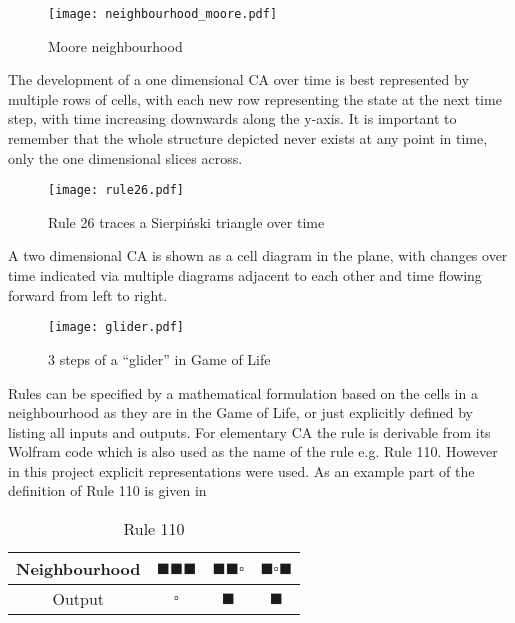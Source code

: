 \begin{figure}[h]
    \centering
    \texttt{[image: neighbourhood\_moore.pdf]}
    \caption{Moore neighbourhood}
    \label{fig:moore}
\end{figure}

The development of a one dimensional CA over time is best represented by multiple rows of cells,
with each new row representing the state at the next time step,
with time increasing downwards along the y-axis.
It is important to remember that the whole structure depicted never exists at any point in time,
only the one dimensional slices across.

\begin{figure}[h]
    \centering
    \texttt{[image: rule26.pdf]}
    \caption{Rule 26 traces a Sierpi\'{n}ski triangle over time}
    \label{fig:rule26}
\end{figure}

A two dimensional CA is shown as a cell diagram in the plane,
with changes over time indicated via multiple diagrams adjacent to each other
and time flowing forward from left to right.

\begin{figure}[h]
    \centering
    \texttt{[image: glider.pdf]}
    \caption{3 steps of a ``glider'' in Game of Life}
    \label{fig:glider}
\end{figure}

Rules can be specified by a mathematical formulation based on the cells in a neighbourhood as they are in the Game of Life,
or just explicitly defined by listing all inputs and outputs.
For elementary CA the rule is derivable from its Wolfram code which is also used as the name of the rule e.g. Rule 110.
However in this project explicit representations were used.
As an example part of the definition of Rule 110 is given in 

\begin{table}[htbp]
    \centering
    \begin{tabular}{c|ccc}
        Neighbourhood & $\blacksquare \blacksquare \blacksquare$ & $\blacksquare \blacksquare \square$ & $\blacksquare \square \blacksquare$  \\
         \hline
         Output & $\square$ & $\blacksquare$ & $\blacksquare$
    \end{tabular}
    \caption{Rule 110}
    \label{table:rule110}
\end{table}


